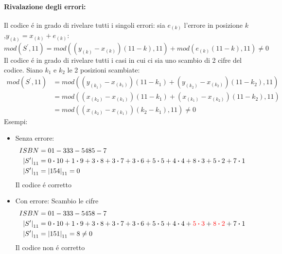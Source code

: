             \paragraph{Rivalazione degli errori:} Il codice é in grado di rivelare tutti i singoli errori:
            sia $e_{(k)}$ l'errore in posizione $k$,$y_{(k)} = x_{(k)}+ e_{(k)}$:
            \[
                mod(S^\prime,11) = mod((y_{(k)}-x_{(k)})(11-k),11)+mod(e_{(k)}(11-k),11) \neq 0
            \]
            Il codice é in grado di rivelare tutti i casi in cui ci sia uno scambio di 2 cifre del codice. Siano 
            $k_1$ e $k_2$ le 2 posizioni scambiate:
            \begin{align}
                mod(S^\prime,11) &= mod \left((y_{(k_1)}-x_{(k_1)})(11-k_1)+(y_{(k_2)}-x_{(k_2)})(11-k_2),11\right) \nonumber \\
                                 &= mod \left((x_{(k_2)}-x_{(k_1)})(11-k_1)+(x_{(k_1)}-x_{(k_2)})(11-k_2),11\right)\nonumber \\
                                 &= mod \left((x_{(k_2)}-x_{(k_1)})(k_2-k_1),11\right) \neq 0 \nonumber
            \end{align}
            Esempi:
            \begin{itemize}
                \item {Senza errore:
                    \begin{align}
                        ISBN & = 01-333-5485-7 \nonumber \\
                        \left| S^\prime \right|_{11} &= 0\dotproduct 10 +1\dotproduct 9+3\dotproduct 8+3\dotproduct 7+3\dotproduct 6+5\dotproduct 5+4\dotproduct 4+8\dotproduct 3+5\dotproduct 2+7\dotproduct 1\nonumber \\
                        \left| S^\prime \right|_{11} &= \left| 154 \right|_{11} = 0 \nonumber 
                    \end{align}
                    Il codice é corretto 
                }
                \item {Con errore: Scambio le cifre
                    \begin{align}
                        ISBN & = 01-333-5458-7 \nonumber \\
                        \left| S^\prime \right|_{11} &= 0\dotproduct 10 +1\dotproduct 9+3\dotproduct 8+3\dotproduct 7+3\dotproduct 6+5\dotproduct 5+4\dotproduct 4+{\color{red}5\dotproduct 3}+{\color{red}8\dotproduct 2}+7\dotproduct 1\nonumber \\
                        \left| S^\prime \right|_{11} &= \left| 151 \right|_{11} = 8 \neq 0 \nonumber 
                    \end{align}
                    Il codice non é corretto 
                }
            \end{itemize}
